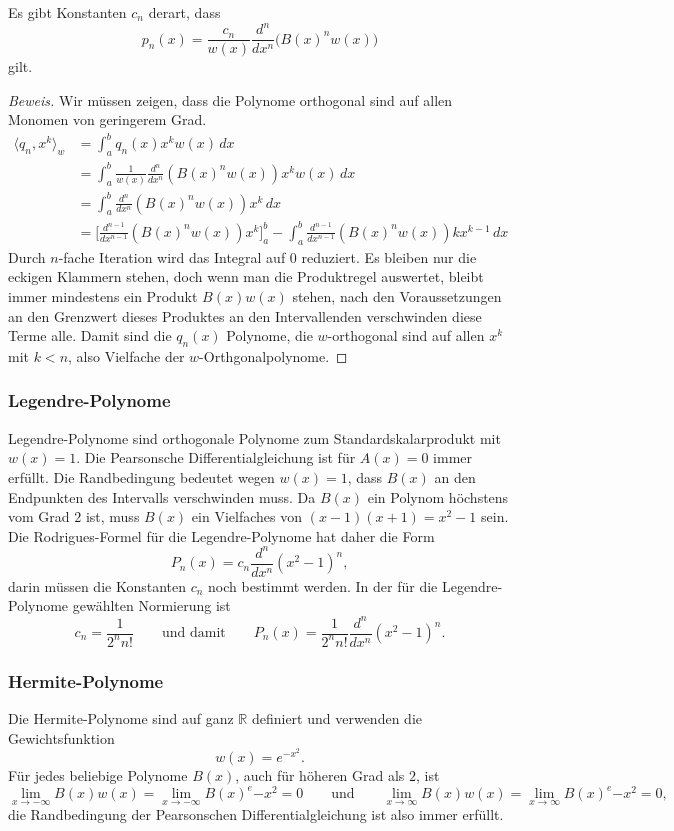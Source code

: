 \begin{satz}
Es gibt Konstanten $c_n$ derart, dass
\[
p_n(x)
=
\frac{c_n}{w(x)} \frac{d^n}{dx^n} \bigl(B(x)^n w(x)\bigr) 
\]
gilt.
\end{satz}

\begin{proof}[Beweis]
Wir müssen zeigen, dass die Polynome orthogonal sind auf allen Monomen
von geringerem Grad.
\begin{align*}
\langle q_n, x^k\rangle_w
&=
\int_a^b q_n(x)x^kw(x)\,dx
\\
&=
\int_a^b \frac{1}{w(x)}\frac{d^n}{dx^n}(B(x)^n w(x)) x^k w(x)\,dx
\\
&=
\int_a^b \frac{d^n}{dx^n}(B(x)^n w(x)) x^k \,dx
\\
&=
\biggl[\frac{d^{n-1}}{dx^{n-1}}(B(x)^n w(x)) x^k \biggr]_a^b
-
\int_a^b \frac{d^{n-1}}{dx^{n-1}}(B(x)^n w(x))kx^{k-1}\,dx
\end{align*}
Durch $n$-fache Iteration wird das Integral auf $0$ reduziert.
Es bleiben nur die eckigen Klammern stehen, doch wenn man die Produktregel
auswertet, bleibt immer mindestens ein Produkt $B(x)w(x)$ stehen,
nach den Voraussetzungen an den Grenzwert dieses Produktes an den
Intervallenden verschwinden diese Terme alle.
Damit sind die $q_n(x)$ Polynome, die $w$-orthogonal sind auf allen
$x^k$ mit $k<n$, also Vielfache der $w$-Orthgonalpolynome.
\end{proof}

\subsubsection{Legendre-Polynome}
Legendre-Polynome sind orthogonale Polynome zum Standardskalarprodukt
mit $w(x)=1$.
Die Pearsonsche Differentialgleichung ist für $A(x)=0$ immer erfüllt.
Die Randbedingung bedeutet wegen $w(x)=1$, dass $B(x)$ an den
Endpunkten des Intervalls verschwinden muss.
Da $B(x)$ ein Polynom höchstens vom Grad $2$ ist, muss $B(x)$ ein
Vielfaches von $(x-1)(x+1)=x^2-1$ sein.
Die Rodrigues-Formel für die Legendre-Polynome hat daher die Form
\[
P_n(x)
=
c_n
\frac{d^n}{dx^n}
(x^2-1)^n,
\]
darin müssen die Konstanten $c_n$ noch bestimmt werden.
In der für die Legendre-Polynome gewählten Normierung ist
\[
c_n = \frac1{2^n n!}
\qquad\text{und damit}\qquad
P_n(x)
=
\frac{1}{2^nn!}
\frac{d^n}{dx^n}
(x^2-1)^n.
\]

\subsubsection{Hermite-Polynome}
Die Hermite-Polynome sind auf ganz $\mathbb{R}$ definiert und verwenden
die Gewichtsfunktion
\[
w(x) = e^{-x^2}.
\]
Für jedes beliebige Polynome $B(x)$, auch für höheren Grad als $2$, ist
\[
\lim_{x\to-\infty} B(x) w(x)
=
\lim_{x\to-\infty} B(x)^e{-x^2}
=
0
\qquad\text{und}\qquad
\lim_{x\to\infty} B(x) w(x)
=
\lim_{x\to\infty} B(x)^e{-x^2}
=
0,
\]
die Randbedingung der Pearsonschen Differentialgleichung ist also
immer erfüllt.

